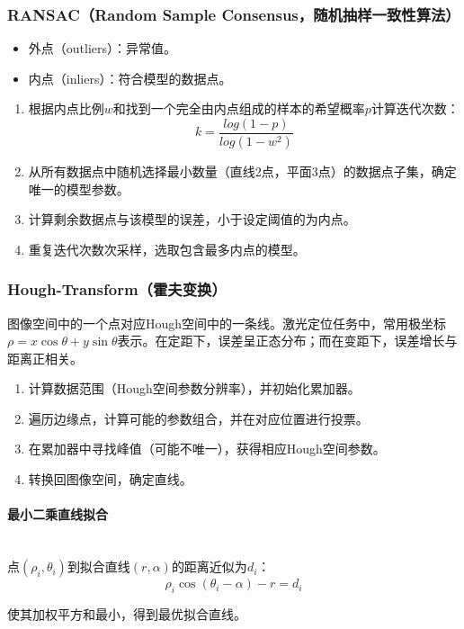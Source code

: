 \documentclass[
12pt, %
a4paper, 
oneside, %
headinclude,footinclude, %
]{scrartcl}
\begin{document}
\subsubsection[RANSAC]{RANSAC（Random Sample Consensus，随机抽样一致性算法）}
\begin{itemize}
\item 外点（outliers）：异常值。
\item 内点（inliers）：符合模型的数据点。
\end{itemize}
\begin{enumerate}
\item 根据内点比例$ w $和找到一个完全由内点组成的样本的希望概率$ p $计算迭代次数：
$$ k = \frac{log(1 - p)}{log(1 - w^2)} $$
\item 从所有数据点中随机选择最小数量（直线2点，平面3点）的数据点子集，确定唯一的模型参数。
\item 计算剩余数据点与该模型的误差，小于设定阈值的为内点。
\item 重复迭代次数次采样，选取包含最多内点的模型。
\end{enumerate}
\subsubsection[Hough-Transform]{Hough-Transform（霍夫变换）}
图像空间中的一个点对应Hough空间中的一条线。激光定位任务中，常用极坐标$ \rho = x \cos\theta + y \sin\theta $表示。在定距下，误差呈正态分布；而在变距下，误差增长与距离正相关。
\begin{enumerate}
\item 计算数据范围（Hough空间参数分辨率），并初始化累加器。
\item 遍历边缘点，计算可能的参数组合，并在对应位置进行投票。
\item 在累加器中寻找峰值（可能不唯一），获得相应Hough空间参数。
\item 转换回图像空间，确定直线。
\end{enumerate}
\paragraph{最小二乘直线拟合}~\\

点$ (\rho_i, \theta_i) $到拟合直线$ (r, \alpha) $的距离近似为$ d_i $：
$$ \rho_i \cos(\theta_i - \alpha) - r = d_i $$

使其加权平方和最小，得到最优拟合直线。
\end{document}
